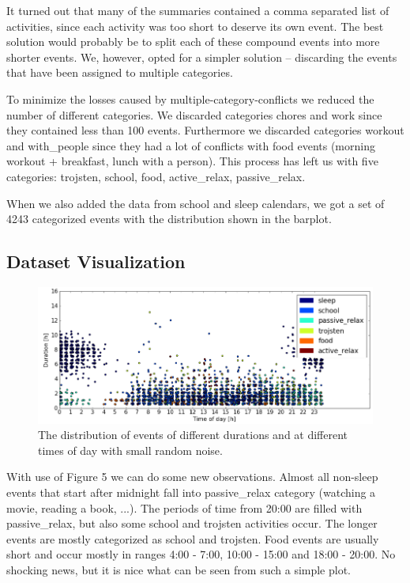\documentclass[a4paper, 12pt]{article}
\begin{document}
It turned out that many of the summaries contained a comma separated list of 
activities, since each activity was too short to deserve its own event. 
The best solution would probably be to split each of these compound events into more 
shorter events. We, however, opted for a simpler solution -- discarding the 
events that have been assigned to multiple categories.


To minimize the losses caused by multiple-category-conflicts we reduced
the number of different categories. We discarded categories chores and work
since they contained less than 100 events. Furthermore we discarded categories
workout and with\_people since they had a lot of conflicts with food events 
(morning workout + breakfast, lunch with a person). This process has left us
with five categories: trojsten, school, food, active\_relax, passive\_relax.

When we also added the data from school and sleep calendars, we got a set
of 4243 categorized events with the distribution shown in the barplot.

\subsection{Dataset Visualization}

\begin{figure}[H]
\centerline{\includegraphics[width=1.1\textwidth]{6class-duration-vs-tod.png}}
\caption{The distribution of events of different durations and at different times
of day with small random noise.}
\end{figure}

With use of Figure 5 we can do some new observations.
Almost all non-sleep events that start after midnight fall into passive\_relax
category (watching a movie, reading a book, ...). The periods of time from 20:00
are filled with passive\_relax, but also some school and trojsten activities occur.
The longer events are mostly categorized as school and trojsten. Food events
are usually short and occur mostly in ranges 4:00 - 7:00, 10:00 - 15:00 and 
18:00 - 20:00. No shocking news, but it is nice what can be seen from such 
a simple plot.
\end{document}

